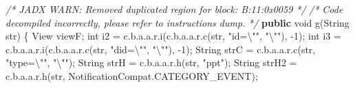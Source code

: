 \documentclass[
]{article}
\newenvironment{Shaded}{}{}
\newcommand{\BuiltInTok}[1]{\textcolor[rgb]{0.00,0.50,0.00}{#1}}
\newcommand{\CommentTok}[1]{\textcolor[rgb]{0.38,0.63,0.69}{\textit{#1}}}
\newcommand{\DataTypeTok}[1]{\textcolor[rgb]{0.56,0.13,0.00}{#1}}
\newcommand{\DecValTok}[1]{\textcolor[rgb]{0.25,0.63,0.44}{#1}}
\newcommand{\FunctionTok}[1]{\textcolor[rgb]{0.02,0.16,0.49}{#1}}
\newcommand{\KeywordTok}[1]{\textcolor[rgb]{0.00,0.44,0.13}{\textbf{#1}}}
\newcommand{\NormalTok}[1]{#1}
\newcommand{\OperatorTok}[1]{\textcolor[rgb]{0.40,0.40,0.40}{#1}}
\newcommand{\SpecialCharTok}[1]{\textcolor[rgb]{0.25,0.44,0.63}{#1}}
\newcommand{\StringTok}[1]{\textcolor[rgb]{0.25,0.44,0.63}{#1}}
\begin{document}
\begin{Shaded}
\begin{Highlighting}[]
    \CommentTok{/* JADX WARN: Removed duplicated region for block: B:11:0x0059  */}
    \CommentTok{/*}
\CommentTok{        Code decompiled incorrectly, please refer to instructions dump.}
\CommentTok{    */}
    \KeywordTok{public} \DataTypeTok{void} \FunctionTok{g}\OperatorTok{(}\BuiltInTok{String}\NormalTok{ str}\OperatorTok{)} \OperatorTok{\{}
        \BuiltInTok{View}\NormalTok{ viewF}\OperatorTok{;}
        \DataTypeTok{int}\NormalTok{ i2 }\OperatorTok{=}\NormalTok{ c}\OperatorTok{.}\FunctionTok{b}\OperatorTok{.}\FunctionTok{a}\OperatorTok{.}\FunctionTok{a}\OperatorTok{.}\FunctionTok{r}\OperatorTok{.}\FunctionTok{i}\OperatorTok{(}\NormalTok{c}\OperatorTok{.}\FunctionTok{b}\OperatorTok{.}\FunctionTok{a}\OperatorTok{.}\FunctionTok{a}\OperatorTok{.}\FunctionTok{r}\OperatorTok{.}\FunctionTok{c}\OperatorTok{(}\NormalTok{str}\OperatorTok{,} \StringTok{"id=}\SpecialCharTok{\textbackslash{}"}\StringTok{"}\OperatorTok{,} \StringTok{"}\SpecialCharTok{\textbackslash{}"}\StringTok{"}\OperatorTok{),} \OperatorTok{{-}}\DecValTok{1}\OperatorTok{);}
        \DataTypeTok{int}\NormalTok{ i3 }\OperatorTok{=}\NormalTok{ c}\OperatorTok{.}\FunctionTok{b}\OperatorTok{.}\FunctionTok{a}\OperatorTok{.}\FunctionTok{a}\OperatorTok{.}\FunctionTok{r}\OperatorTok{.}\FunctionTok{i}\OperatorTok{(}\NormalTok{c}\OperatorTok{.}\FunctionTok{b}\OperatorTok{.}\FunctionTok{a}\OperatorTok{.}\FunctionTok{a}\OperatorTok{.}\FunctionTok{r}\OperatorTok{.}\FunctionTok{c}\OperatorTok{(}\NormalTok{str}\OperatorTok{,} \StringTok{"did=}\SpecialCharTok{\textbackslash{}"}\StringTok{"}\OperatorTok{,} \StringTok{"}\SpecialCharTok{\textbackslash{}"}\StringTok{"}\OperatorTok{),} \OperatorTok{{-}}\DecValTok{1}\OperatorTok{);}
        \BuiltInTok{String}\NormalTok{ strC }\OperatorTok{=}\NormalTok{ c}\OperatorTok{.}\FunctionTok{b}\OperatorTok{.}\FunctionTok{a}\OperatorTok{.}\FunctionTok{a}\OperatorTok{.}\FunctionTok{r}\OperatorTok{.}\FunctionTok{c}\OperatorTok{(}\NormalTok{str}\OperatorTok{,} \StringTok{"type=}\SpecialCharTok{\textbackslash{}"}\StringTok{"}\OperatorTok{,} \StringTok{"}\SpecialCharTok{\textbackslash{}"}\StringTok{"}\OperatorTok{);}
        \BuiltInTok{String}\NormalTok{ strH }\OperatorTok{=}\NormalTok{ c}\OperatorTok{.}\FunctionTok{b}\OperatorTok{.}\FunctionTok{a}\OperatorTok{.}\FunctionTok{a}\OperatorTok{.}\FunctionTok{r}\OperatorTok{.}\FunctionTok{h}\OperatorTok{(}\NormalTok{str}\OperatorTok{,} \StringTok{"ppt"}\OperatorTok{);}
        \BuiltInTok{String}\NormalTok{ strH2 }\OperatorTok{=}\NormalTok{ c}\OperatorTok{.}\FunctionTok{b}\OperatorTok{.}\FunctionTok{a}\OperatorTok{.}\FunctionTok{a}\OperatorTok{.}\FunctionTok{r}\OperatorTok{.}\FunctionTok{h}\OperatorTok{(}\NormalTok{str}\OperatorTok{,}\NormalTok{ NotificationCompat}\OperatorTok{.}\FunctionTok{CATEGORY\_EVENT}\OperatorTok{);}

\end{Highlighting}
\end{Shaded}
\end{document}
